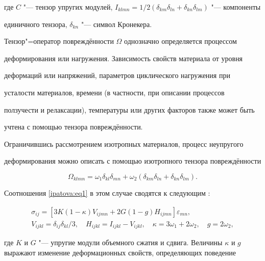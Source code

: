 где $C$ "--- тензор упругих модулей, $I_{klmn} =1/2 (\delta_{km} \delta _{ln} +\delta _{kn} \delta _{lm})$ "--- компоненты

единичного тензора, $\delta _{kn} $ "--- символ Кронекера.



Тензор"=оператор повреждённости $\Omega $ однозначно определяется процессом

деформирования или нагружения. Зависимость свойств материала от уровня

деформаций или напряжений, параметров циклического нагружения при

усталости материалов, времени (в частности, при описании процессов

ползучести и релаксации), температуры или других факторов также может быть

учтена с помощью тензора повреждённости.



Ограничившись рассмотрением изотропных материалов, процесс неупругого

деформирования можно описать с помощью изотропного тензора повреждённости

\[

\Omega _{klmn} =\omega _1 \delta _{kl} \delta _{mn} +\omega _2 (\delta _{km} \delta _{ln } +\delta _{kn} \delta _{lm} ).

\]

Соотношения \eqref{ipatova:eq1} в этом случае сводятся к следующим \cite{ipatova:bib16}:

\begin{equation}

\label{ipatova:eq2}

\begin{array}{c}

\sigma _{ij}  = [3K(1-\kappa) V_{ijmn} +2G (1-g) H_{ijmn}] \varepsilon _{mn}, \\

V_{ijkl}  = \delta _{ij} \delta _{kl}/3, \quad H_{ijkl} =I_{ijkl}

-V_{ijkl}, \quad \kappa =3 \omega_1 + 2\omega _2,  \quad g=2\omega _2,

\end{array}

\end{equation}

где $K$ и $G$ "--- упругие модули объемного сжатия и сдвига. Величины $\kappa

$ и $g$ выражают изменение деформационных свойств, определяющих поведение

